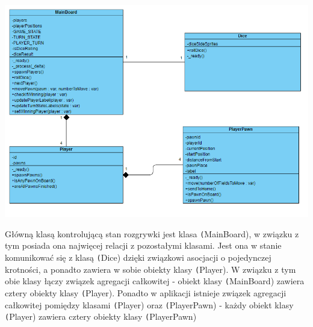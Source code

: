 \documentclass[conference]{IEEEtran}
\begin{document}
\hspace*{-2cm}\includegraphics[scale=0.48]{Class.PNG} \par
Główną klasą kontrolującą stan rozgrywki jest klasa \texttt(MainBoard), w związku z tym posiada ona najwięcej relacji z pozostałymi klasami. Jest ona w stanie komunikować się z klasą \texttt(Dice) dzięki związkowi asocjacji o pojedynczej krotności, a ponadto zawiera w sobie obiekty klasy \texttt(Player). W związku z tym obie klasy łączy związek agregacji całkowitej - obiekt klasy \texttt(MainBoard) zawiera cztery obiekty klasy \texttt(Player). Ponadto w aplikacji istnieje związek agregacji całkowitej pomiędzy klasami \texttt(Player) oraz \texttt(PlayerPawn) - każdy obiekt klasy \texttt(Player) zawiera cztery obiekty klasy \texttt(PlayerPawn)
\end{document}
